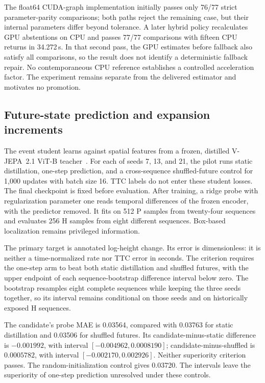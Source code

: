 The float64 CUDA-graph implementation initially passes only 76/77 strict parameter-parity comparisons; both paths reject the remaining case, but their internal parameters differ beyond tolerance. A later hybrid policy recalculates GPU abstentions on CPU and passes 77/77 comparisons with fifteen CPU returns in 34.272\,s. In that second pass, the GPU estimates before fallback also satisfy all comparisons, so the result does not identify a deterministic fallback repair. No contemporaneous CPU reference establishes a controlled acceleration factor. The experiment remains separate from the delivered estimator and motivates no promotion. 

\subsection{Future-state prediction and expansion increments}
The event student learns against spatial features from a frozen, distilled V-JEPA~2.1 ViT-B teacher~\citep{vjepa21}. For each of seeds 7, 13, and 21, the pilot runs static distillation, one-step prediction, and a cross-sequence shuffled-future control for 1,000 updates with batch size 16. TTC labels do not enter these student losses. The final checkpoint is fixed before evaluation. After training, a ridge probe with regularization parameter one reads temporal differences of the frozen encoder, with the predictor removed. It fits on 512 P samples from twenty-four sequences and evaluates 256 H samples from eight different sequences. Box-based localization remains privileged information. 

The primary target is annotated log-height change. Its error is dimensionless: it is neither a time-normalized rate nor TTC error in seconds. The criterion requires the one-step arm to beat both static distillation and shuffled futures, with the upper endpoint of each sequence-bootstrap difference interval below zero. The bootstrap resamples eight complete sequences while keeping the three seeds together, so its interval remains conditional on those seeds and on historically exposed H sequences.

\EvidenceJepaTable
The candidate's probe MAE is 0.03564, compared with 0.03763 for static distillation and 0.03506 for shuffled futures. Its candidate-minus-static difference is $-0.001992$, with interval $[-0.004962,0.0008190]$; candidate-minus-shuffled is $0.0005782$, with interval $[-0.002170,0.002926]$. Neither superiority criterion passes. The random-initialization control gives 0.03720. The intervals leave the superiority of one-step prediction unresolved under these controls.

